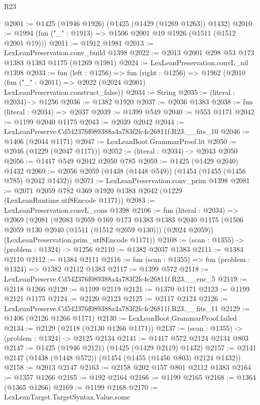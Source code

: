 \begin{lexlean}{R23}
\begin{coremodule}
@2001 := @1425 (@1946 @1926) (@1425 (@1429 (@1269 @1263)) @1432)
@2010 := @1994 (fun ("_" : @1913) => @1506 @2001 @19 @1926 (@1511 (@1512 @2001 @19)))
@2011 := @1912 @1981
@2013 := LexLeanPreservation.conv_build @1398
@2022 := @2013 @2001 @298 @53 @173 @1383 @1383 @1175 (@1269 @1981)
@2024 := LexLeanPreservation.convL_nil @1398
@2033 := fun (left : @1256) =>
  fun (right : @1256) =>
  @1962 (@2010 (fun ("_" : @2011) => @2022 (@2024 @2001) LexLeanPreservation.construct_false))
@2034 := String
@2035 := (literal : @2034) -> @1256
@2036 := @1382 @1920
@2037 := @2036 @1383
@2038 := fun (literal : @2034) => @2037
@2039 := @1399 @549
@2040 := @553 @1171
@2042 := @1199 @2040 @1175
@2043 := @2039 @2042
@2044 := LexLeanPreserve.Cd542376f089388a4a783f2fc4c26811f.R23.__fits_10
@2046 := @1406 (@2044 @1171)
@2047 := LexLeanBoot.GrammarProof.lit
@2050 := @2046 (@1229 (@2047 @1171))
@2052 := (literal : @2034) -> @2043 @2050
@2056 := @1417 @549 @2042 @2050 @785
@2059 := @1425 (@1429 @2040) @1432
@2069 := @2056 @2059 (@1438 (@1448 @549)) (@1454 (@1455 (@1456 @785) @2042 @1432))
@2071 := LexLeanPreservation.conv_prim @1398
@2081 := @2071 @2059 @782 @369 @1920 @1383 @2042 (@1229 (LexLeanRuntime.utf8Encode @1171))
@2083 := LexLeanPreservation.convL_cons @1398
@2106 := fun (literal : @2034) =>
  @2069
    (@2081
      (@2083
        @2059
        @169
        @173
        @1383
        @1383
        @2040
        @1175
        (@1506 @2059 @130 @2040 (@1511 (@1512 @2059 @130)))
        (@2024 @2059))
      (LexLeanPreservation.prim_utf8Encode @1171))
@2108 := (scan : @1355) -> (problem : @1324) -> @1256
@2110 := @1382 @2037 @1383
@2111 := @1384 @2110
@2112 := @1384 @2111
@2116 := fun (scan : @1355) => fun (problem : @1324) => @1382 @2112 @1383
@2117 := @1399 @572
@2118 := LexLeanPreserve.Cd542376f089388a4a783f2fc4c26811f.R23.__enc_5
@2119 := @2118 @1266
@2120 := @1199 @2119
@2121 := @1370 @1171
@2123 := @1199 @2121 @1175
@2124 := @2120 @2123
@2125 := @2117 @2124
@2126 := LexLeanPreserve.Cd542376f089388a4a783f2fc4c26811f.R23.__fits_11
@2129 := @1406 (@2126 @1266 @1171)
@2130 := LexLeanBoot.GrammarProof.failed
@2134 := @2129 (@2118 (@2130 @1266 @1171))
@2137 := (scan : @1355) -> (problem : @1324) -> @2125 @2134
@2141 := @1417 @572 @2124 @2134 @803
@2147 := @1425 (@1946 @2121) (@1425 (@1429 @2119) @1432)
@2157 := @2141 @2147 (@1438 (@1448 @572)) (@1454 (@1455 (@1456 @803) @2124 @1432))
@2158 := @2013 @2147
@2163 := @2158 @202 @157 @801 @2112 @1383
@2164 := @1357 @1266
@2165 := @192 @2164
@2166 := @1199 @2165
@2168 := @1364 (@1365 @1266)
@2169 := @1199 @2168
@2170 := LexLeanTarget.TargetSyntax.Value.some

\end{coremodule}
\end{lexlean}

